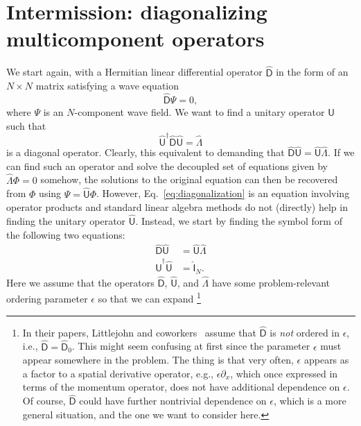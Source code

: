 \section{Intermission: diagonalizing multicomponent operators}

We start again, with a Hermitian linear differential operator $\widehat{\mathsf{D}}$ in the form of an $N\times N$ matrix satisfying a wave equation
%
\begin{equation}
  \widehat{\mathsf{D}}\Psi = 0,
\end{equation}
%
where $\Psi$ is an $N$-component wave field.
%
We want to find a unitary operator $\widehat{\mathsf{U}}$ such that
%
\begin{equation}
  \widehat{\mathsf{U}}^{\dagger}\widehat{\mathsf{D}}\widehat{\mathsf{U}} = \widehat{\Lambda}\label{eq:diagonalization}
\end{equation}
%
is a diagonal operator.
Clearly, this equivalent to demanding that $\widehat{\mathsf{D}}\widehat{\mathsf{U}} = \widehat{\mathsf{U}}\widehat{\Lambda}$.
If we can find such an operator and solve the decoupled set of equations given by $\widehat{\Lambda}\Phi = 0$ somehow,
the solutions to the original equation can then be recovered from $\Phi$ using $\Psi = \widehat{\mathsf{U}}\Phi$.
However, Eq.~\eqref{eq:diagonalization} is an equation involving operator products and standard linear algebra methods do not (directly) help in finding the unitary operator $\widehat{\mathsf{U}}$.
Instead, we start by finding the symbol form of the following two equations:
%
\begin{equation}
  \begin{aligned}
    \widehat{\mathsf{D}}\widehat{\mathsf{U}} &= \widehat{\mathsf{U}}\widehat{\Lambda}\\
    \widehat{\mathsf{U}}^{\dagger}\widehat{\mathsf{U}} &= \hat{\mathsf{I}}_{N}.
  \end{aligned}
  \label{eq:diagonal2}
\end{equation}
%
Here we assume that the operators $\widehat{\mathsf{D}}$, $\widehat{\mathsf{U}}$, and $\widehat{\Lambda}$ have some problem-relevant ordering parameter $\epsilon$ so that we can expand%
\footnote{In their papers, Littlejohn and coworkers~\cite{littlejohn1991,weigert1993} assume that $\widehat{\mathsf{D}}$ is \emph{not} ordered in $\epsilon$, i.e., $\widehat{\mathsf{D}} = \widehat{\mathsf{D}}_{0}$.
  This might seem confusing at first since the parameter $\epsilon$ must appear somewhere in the problem.
  The thing is that very often, $\epsilon$ appears as a factor to a spatial derivative operator, e.g., $\epsilon\partial_{x}$, which once expressed in terms of the momentum operator, does not have additional dependence on $\epsilon$.
  Of course, $\widehat{\mathsf{D}}$ could have further nontrivial dependence on $\epsilon$, which is a more general situation, and the one we want to consider here.
}
